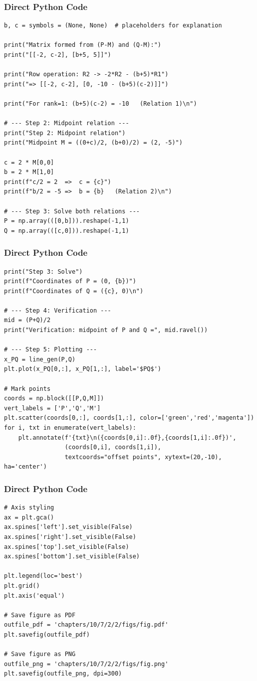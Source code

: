 \documentclass{beamer}
\begin{document}
\begin{frame}[fragile]
	\frametitle{Direct Python Code}
	\begin{lstlisting}
b, c = symbols = (None, None)  # placeholders for explanation

print("Matrix formed from (P-M) and (Q-M):")
print("[[-2, c-2], [b+5, 5]]")

print("Row operation: R2 -> -2*R2 - (b+5)*R1")
print("=> [[-2, c-2], [0, -10 - (b+5)(c-2)]]")

print("For rank=1: (b+5)(c-2) = -10   (Relation 1)\n")

# --- Step 2: Midpoint relation ---
print("Step 2: Midpoint relation")
print("Midpoint M = ((0+c)/2, (b+0)/2) = (2, -5)")

c = 2 * M[0,0]
b = 2 * M[1,0]
print(f"c/2 = 2  =>  c = {c}")
print(f"b/2 = -5 =>  b = {b}   (Relation 2)\n")

# --- Step 3: Solve both relations ---
P = np.array(([0,b])).reshape(-1,1)
Q = np.array(([c,0])).reshape(-1,1)
\end{lstlisting}
\end{frame}
\begin{frame}[fragile]
	\frametitle{Direct Python Code}
	\begin{lstlisting}
print("Step 3: Solve")
print(f"Coordinates of P = (0, {b})")
print(f"Coordinates of Q = ({c}, 0)\n")

# --- Step 4: Verification ---
mid = (P+Q)/2
print("Verification: midpoint of P and Q =", mid.ravel())

# --- Step 5: Plotting ---
x_PQ = line_gen(P,Q)
plt.plot(x_PQ[0,:], x_PQ[1,:], label='$PQ$')

# Mark points
coords = np.block([[P,Q,M]])
vert_labels = ['P','Q','M']
plt.scatter(coords[0,:], coords[1,:], color=['green','red','magenta'])
for i, txt in enumerate(vert_labels):
    plt.annotate(f'{txt}\n({coords[0,i]:.0f},{coords[1,i]:.0f})',
                 (coords[0,i], coords[1,i]),
                 textcoords="offset points", xytext=(20,-10), ha='center')
\end{lstlisting}
\end{frame}
\begin{frame}[fragile]
	\frametitle{Direct Python Code}
	\begin{lstlisting}
# Axis styling
ax = plt.gca()
ax.spines['left'].set_visible(False)
ax.spines['right'].set_visible(False)
ax.spines['top'].set_visible(False)
ax.spines['bottom'].set_visible(False)

plt.legend(loc='best')
plt.grid()
plt.axis('equal')

# Save figure as PDF
outfile_pdf = 'chapters/10/7/2/2/figs/fig.pdf'
plt.savefig(outfile_pdf)

# Save figure as PNG
outfile_png = 'chapters/10/7/2/2/figs/fig.png'
plt.savefig(outfile_png, dpi=300)
\end{lstlisting}
\end{frame}
\end{document}
